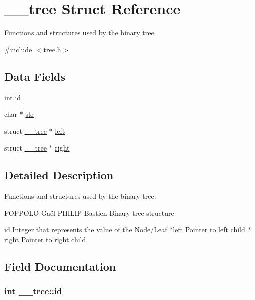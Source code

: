 \hypertarget{struct____tree}{}\section{\+\_\+\+\_\+tree Struct Reference}
\label{struct____tree}


Functions and structures used by the binary tree.  




{\ttfamily \#include $<$tree.\+h$>$}

\subsection*{Data Fields}
\begin{DoxyCompactItemize}
\item 
int \hyperlink{struct____tree_a65cdae2ae7a890ff479a4b6da6e3f8e8}{id}
\item 
char $\ast$ \hyperlink{struct____tree_a356fa3e93ab5e39c4b58b444d81cec9d}{str}
\item 
struct \hyperlink{struct____tree}{\+\_\+\+\_\+tree} $\ast$ \hyperlink{struct____tree_add254a73fa2eb8e44b227438da551e5d}{left}
\item 
struct \hyperlink{struct____tree}{\+\_\+\+\_\+tree} $\ast$ \hyperlink{struct____tree_a179e161bb34fc074e90309ced3a08e42}{right}
\end{DoxyCompactItemize}


\subsection{Detailed Description}
Functions and structures used by the binary tree. 

F\+O\+P\+P\+O\+LO Gaël  P\+H\+I\+L\+IP Bastien Binary tree structure

id Integer that represents the value of the Node/\+Leaf  $\ast$left Pointer to left child  $\ast$right Pointer to right child 

\subsection{Field Documentation}
\subsubsection[{\texorpdfstring{id}{id}}]{\setlength{\rightskip}{0pt plus 5cm}int \+\_\+\+\_\+tree\+::id}\hypertarget{struct____tree_a65cdae2ae7a890ff479a4b6da6e3f8e8}{}\label{struct____tree_a65cdae2ae7a890ff479a4b6da6e3f8e8}
